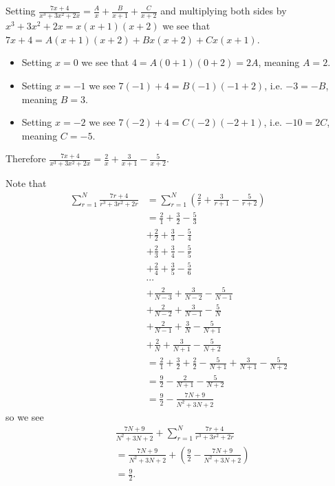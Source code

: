 \begin{questions}
    \item \begin{partquestions}{\roman*}
        \item Setting $\frac{7x+4}{x^3+3x^2+2x} = \frac{A}{x} + \frac{B}{x+1} + \frac{C}{x+2}$ and multiplying both sides by $x^3+3x^2+2x = x(x+1)(x+2)$ we see that $7x+4 = A(x+1)(x+2) + Bx(x+2) + Cx(x+1)$.
        \begin{itemize}
            \item Setting $x = 0$ we see that $4 = A(0+1)(0+2) = 2A$, meaning $A = 2$.
            \item Setting $x = -1$ we see $7(-1) + 4 = B(-1)(-1+2)$, i.e. $-3 = -B$, meaning $B = 3$.
            \item Setting $x = -2$ we see $7(-2) + 4 = C(-2)(-2+1)$, i.e. $-10 = 2C$, meaning $C = -5$.
        \end{itemize}
        Therefore $\frac{7x+4}{x^3+3x^2+2x} = \frac{2}{x} + \frac{3}{x+1} - \frac{5}{x+2}$.

        \item Note that
        \begin{align*}
            \sum_{r=1}^N \frac{7r+4}{r^3+3r^2+2r} &= \sum_{r=1}^N \left(\frac{2}{r} + \frac{3}{r+1} - \frac{5}{r+2}\right)\\
            &= \frac21 + \frac32 - \frac53\\
            &+ \frac22 + \frac33 - \frac54\\
            &+ \frac23 + \frac34 - \frac55\\
            &+ \frac24 + \frac35 - \frac56\\
            &\cdots\\
            &+ \frac2{N-3} + \frac{3}{N-2} - \frac{5}{N-1}\\
            &+ \frac2{N-2} + \frac{3}{N-1} - \frac{5}{N}\\
            &+ \frac2{N-1} + \frac{3}{N} - \frac{5}{N+1}\\
            &+ \frac2{N} + \frac{3}{N+1} - \frac{5}{N+2}\\
            &= \frac21 + \frac32 + \frac22 - \frac{5}{N+1} + \frac{3}{N+1} - \frac{5}{N+2}\\
            &= \frac92 - \frac{2}{N+1} - \frac{5}{N+2}\\
            &= \frac92 - \frac{7N+9}{N^2+3N+2}
        \end{align*}
        so we see
        \begin{align*}
            &\frac{7N+9}{N^2+3N+2} + \sum_{r=1}^N \frac{7r+4}{r^3+3r^2+2r}\\
            &= \frac{7N+9}{N^2+3N+2} + \left(\frac92 - \frac{7N+9}{N^2+3N+2}\right)\\
            &= \frac92.
        \end{align*}
    \end{partquestions}


\end{questions}
